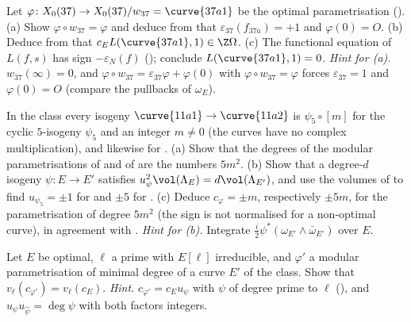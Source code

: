 \begin{exercise}\label{ex:moddeg:ex-37-lvalue}
Let $\varphi\colon X_0(37)\to X_0(37)/w_{37}=\curve{37a1}$ be the optimal parametrisation (). (a) Show $\varphi\circ w_{37}=\varphi$ and deduce from  that
$\varepsilon_{37}(f_{37a})=+1$ and $\varphi(0)=O$. (b) Deduce from  that $c_EL(\curve{37a1},1)\in\Z\Omega$. (c) The functional equation of $L(f,s)$ has sign $-\varepsilon_N(f)$
(); conclude $L(\curve{37a1},1)=0$. \emph{Hint for (a).} $w_{37}(\infty)=0$, and $\varphi\circ w_{37}=\varepsilon_{37}\varphi+\varphi(0)$ with $\varphi\circ w_{37}=\varphi$ forces $\varepsilon_{37}=1$ and
$\varphi(0)=O$ (compare the pullbacks of $\omega_E$).
\end{exercise}

\begin{exercise}\label{ex:moddeg:ex-11a-degrees}
In the class  every isogeny $\curve{11a1}\to\curve{11a2}$ is $\psi_5\circ[m]$ for the cyclic $5$-isogeny $\psi_5$ and an integer $m\ne0$ (the curves have no complex multiplication), and likewise for
. (a) Show that the degrees of the modular parametrisations of  and of  are the numbers $5m^2$. (b) Show that a degree-$d$ isogeny $\psi\colon E\to E'$ satisfies
$u_\psi^2\vol(\Lambda_E)=d\vol(\Lambda_{E'})$, and use the volumes of  to find $u_{\psi_5}=\pm1$ for  and $\pm5$ for . (c) Deduce $c_\varphi=\pm m$, respectively $\pm5m$,
for the parametrisation of degree $5m^2$ (the sign is not normalised for a non-optimal curve), in agreement with . \emph{Hint for (b).} Integrate $\frac i2\psi^*(\omega_{E'}\wedge\bar\omega_{E'})$ over $E$.
\end{exercise}

\begin{exercise}\label{ex:moddeg:ex-manin-class}
Let $E$ be optimal, $\ell$ a prime with $E[\ell]$ irreducible, and $\varphi'$ a modular parametrisation of minimal degree of a curve $E'$ of the class. Show that $v_\ell(c_{\varphi'})=v_\ell(c_E)$.
\emph{Hint.} $c_{\varphi'}=c_Eu_\psi$ with $\psi$ of degree prime to $\ell$ (), and $u_\psi u_{\hat\psi}=\deg\psi$ with both factors integers.
\end{exercise}

